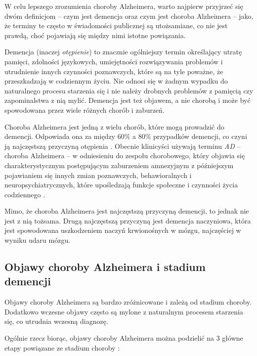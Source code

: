 W celu lepszego zrozumienia choroby Alzheimera, warto najpierw przyjrzeć się dwóm definicjom -- czym jest demencja oraz czym jest choroba Alzheimera -- jako, że terminy te często w świadomości publicznej są utożsamiane, co nie jest prawdą, choć pojawiają się między nimi istotne powiązania.

Demencja (inaczej \emph{otępienie}) to znacznie ogólniejszy termin określający utratę pamięci, zdolności językowych, umiejętności rozwiązywania problemów i utrudnienie innych czynności poznawczych, które są na tyle poważne, że przeszkadzają w codziennym życiu.
Nie odnosi się w żadnym wypadku do naturalnego procesu starzenia się i nie należy drobnych problemów z pamięcią czy zapominalstwa z nią mylić.
Demencja jest też objawem, a nie chorobą i może być spowodowana przez wiele różnych chorób i zaburzeń.

Choroba Alzheimera jest jedną z wielu chorób, które mogą prowadzić do demencji.
Odpowiada ona za między 60\% a 80\% przypadków demencji, co czyni ją najczęstszą przyczyną otępienia \cite{what-is-alzheimers:2023}.
Obecnie klinicyści używają terminu \emph{AD} -- choroba Alzheimera -- w odniesieniu do zespołu chorobowego, który objawia się charakterystycznym postępującym zaburzeniem amnezyjnym z późniejszym pojawianiem się innych zmian poznawczych, behawioralnych i neuropsychiatrycznych, które upośledzają funkcje społeczne i czynności życia codziennego \cite{cummings2004alzheimer}.

Mimo, że choroba Alzheimera jest najczęstszą przyczyną demencji, to jednak nie jest z nią tożsama.
Drugą najczęstszą przyczyną jest demencja naczyniowa, która jest spowodowana uszkodzeniem naczyń krwionośnych w mózgu, najczęściej w wyniku udaru mózgu.


\subsection{Objawy choroby Alzheimera i stadium demencji}

Objawy choroby Alzheimera są bardzo zróżnicowane i zależą od stadium choroby.
Dodatkowo wczesne objawy często są mylone z naturalnym procesem starzenia się, co utrudnia wczesną diagnozę.

Ogólnie rzecz biorąc, objawy choroby Alzheimera można podzielić na 3 główne etapy powiązane ze stadium choroby \cite{alzheimers-symptoms:2021}:

